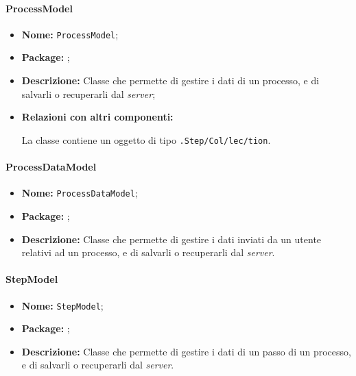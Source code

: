 \paragraph{ProcessModel}
\begin{flushleft}
\begin{itemize}
\item \textbf{Nome:} \texttt{ProcessModel};
\item \textbf{Package:} \texttt{\model{}};
\item \textbf{Descrizione:} Classe che permette di gestire i dati di un processo, e di salvarli o recuperarli dal \textit{server};
\item \textbf{Relazioni con altri componenti:}
\begin{sloppypar}
La classe contiene un oggetto di tipo \texttt{\collection{}.Step\fshyp{}Col\fshyp{}lec\fshyp{}tion}.
\end{sloppypar}
\end{itemize}
\end{flushleft}

\paragraph{ProcessDataModel}
\begin{flushleft}
\begin{itemize}
\item \textbf{Nome:} \texttt{ProcessDataModel};
\item \textbf{Package:} \texttt{\model{}};
\item \textbf{Descrizione:} Classe che permette di gestire i dati inviati da un utente relativi ad un processo, e di salvarli o recuperarli dal \textit{server}.
\end{itemize}
\end{flushleft}

\paragraph{StepModel}
\begin{flushleft}
\begin{itemize}
\item \textbf{Nome:} \texttt{StepModel};
\item \textbf{Package:} \texttt{\model{}};
\item \textbf{Descrizione:} Classe che permette di gestire i dati di un passo di un processo, e di salvarli o recuperarli dal \textit{server}.
\end{itemize}
\end{flushleft}

